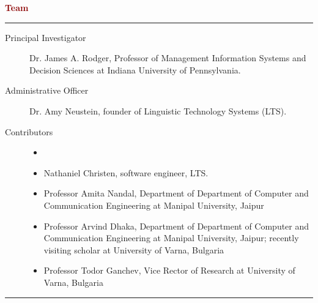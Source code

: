 \documentclass[11pt,letterpaper]{article}
\begin{document}
{\vspace*{14pt}	

\textcolor{darkRed}{\textbf{Team}\vspace{3pt}
\hrule}
\begin{description}

\item[Principal Investigator]  Dr. James A. Rodger, 
Professor of Management Information 
Systems and Decision Sciences at Indiana University of 
Pennsylvania.

\item[Administrative Officer]  Dr. Amy Neustein, 
founder of Linguistic Technology Systems (LTS).

\item[Contributors]  
\begin{itemize}\item[]

\item Nathaniel Christen, software engineer, LTS.

\item Professor Amita Nandal, 
Department of Department of Computer and 
Communication Engineering at Manipal University, Jaipur

\item Professor Arvind Dhaka, 
Department of Department of Computer and 
Communication Engineering at Manipal University, Jaipur; 
recently visiting scholar at 
University of Varna, Bulgaria

\item Professor Todor Ganchev, Vice Rector of Research 
at University of Varna, Bulgaria

\end{itemize}

\end{description}

\vspace{13pt}

\textcolor{darkRed}{\hrule}

}
\end{document}
